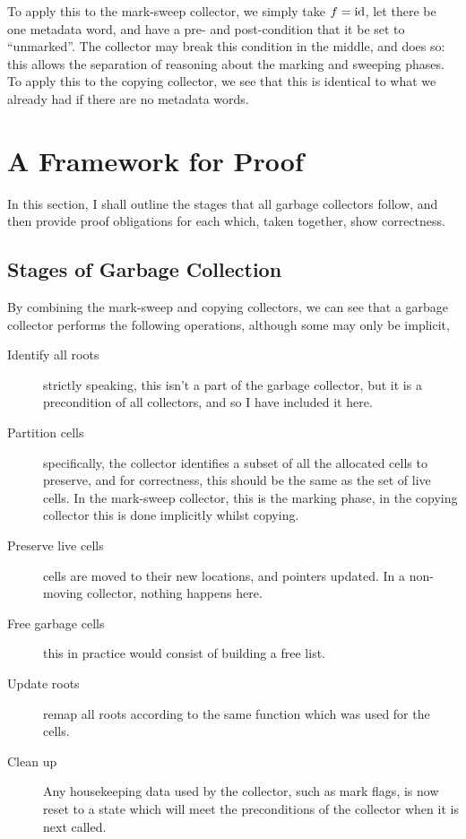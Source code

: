 To apply this to the mark-sweep collector, we simply take $f = \mathrm{id}$,
let there be one metadata word, and have a pre- and post-condition
that it be set to ``unmarked''. The collector may break this condition
in the middle, and does so: this allows the separation of reasoning
about the marking and sweeping phases. To apply this to the copying
collector, we see that this is identical to what we already had if
there are no metadata words.

\section{A Framework for Proof}
\label{sec:gc-framework}

In this section, I shall outline the stages that all garbage
collectors follow, and then provide proof obligations for each which,
taken together, show correctness.

\subsection{Stages of Garbage Collection}
\label{sec:gc-framework-stages}

By combining the mark-sweep and copying collectors, we can see that
a garbage collector performs the following operations, although some
may only be implicit,

\begin{description}
  \item[Identify all roots] strictly speaking, this isn't a part of
    the garbage collector, but it is a precondition of all collectors,
    and so I have included it here.

  \item[Partition cells] specifically, the collector identifies a
    subset of all the allocated cells to preserve, and for
    correctness, this should be the same as the set of live cells. In
    the mark-sweep collector, this is the marking phase, in the
    copying collector this is done implicitly whilst copying.

  \item[Preserve live cells] cells are moved to their new locations,
    and pointers updated. In a non-moving collector, nothing happens
    here.

  \item[Free garbage cells] this in practice would consist of building
    a free list.

  \item[Update roots] remap all roots according to the same function
    which was used for the cells.

  \item[Clean up] Any housekeeping data used by the collector, such as
    mark flags, is now reset to a state which will meet the
    preconditions of the collector when it is next called.
\end{description}

